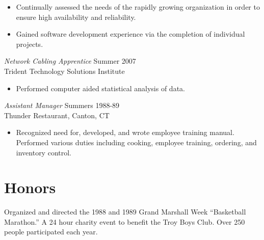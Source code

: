 \documentclass[margin]{res}
\begin{document}
\begin{resume}
\begin{itemize}
	     \item Continually assessed the needs of the rapidly growing organization in order to ensure high availability and reliability. 
	     \item Gained software development experience via the completion of individual projects.
                \end{itemize}
 
                {\sl Network Cabling Apprentice} \hfill            Summer 2007 \\
                Trident Technology Solutions
                Institute 
                 \begin{itemize}  \itemsep -2pt %
                 \item Performed computer aided statistical analysis 
                    of data. 
                 \end{itemize} 
                {\sl Assistant Manager} \hfill        Summers 1988-89 \\
                Thunder Restaurant, Canton, CT
                  \begin{itemize}
                   \item Recognized need for, developed, and wrote 
                    employee training manual. Performed various 
                    duties including cooking, employee training, 
                    ordering, and inventory control. 
                   \end{itemize} 
 
\section{\sc Honors}  Organized and directed the 1988 and 1989 Grand 
                 Marshall Week \newline ``Basketball Marathon.'' A 24 hour 
                charity event to benefit the Troy Boys Club. Over 
                250 people participated each year. 


 

\end{resume}
\end{document}
